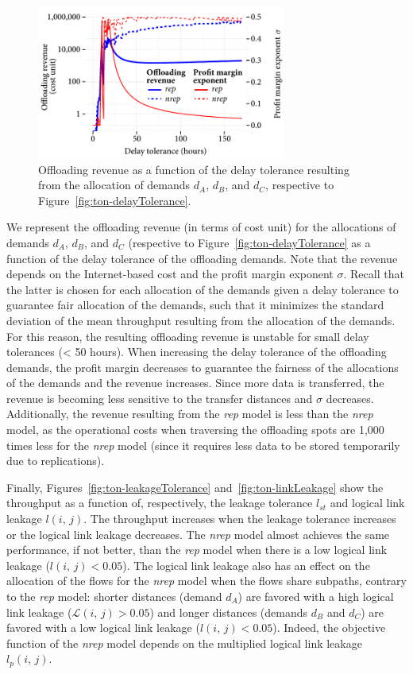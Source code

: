 \begin{figure}
    \centering
    \includegraphics[width=8.2cm]{results/revenue-delaytolerance.pdf}
    \caption{Offloading revenue as a function of the delay tolerance resulting from the allocation of demands $d_A$, $d_B$, and $d_C$, respective to Figure~\ref{fig:ton-delayTolerance}.}
    \label{fig:revenue-delay-tolerance}
\end{figure}
We represent the offloading revenue (in terms of cost unit) for the allocations of demands $d_A$, $d_B$, and $d_C$ (respective to Figure~\ref{fig:ton-delayTolerance} as a function of the delay tolerance of the offloading demands. Note that the revenue depends on the Internet-based cost and the profit margin exponent $\sigma$. Recall that the latter is chosen for each allocation of the demands given a delay tolerance to guarantee fair allocation of the demands, such that it minimizes the standard deviation of the mean throughput resulting from the allocation of the demands. For this reason,  the resulting offloading revenue is unstable for small delay tolerances (\ie < 50 hours). When increasing the delay tolerance of the offloading demands, the profit margin decreases to guarantee the fairness of the allocations of the demands and the revenue increases. Since more data is transferred, the revenue is becoming less sensitive to the transfer distances and $\sigma$ decreases. Additionally, the revenue resulting from the \textit{rep} model is less than the \textit{nrep} model, as the operational costs when traversing the offloading spots are 1,000 times less for the \textit{nrep} model (since it requires less data to be stored temporarily due to replications).

Finally, Figures~\ref{fig:ton-leakageTolerance} and~\ref{fig:ton-linkLeakage} show the throughput as a function of, respectively, the leakage tolerance $l_{st}$ and logical link leakage $l(i,\,j)$.  The throughput increases when the leakage tolerance increases or the logical link leakage decreases. The \textit{nrep} model almost achieves the same performance, if not better, than the \textit{rep} model when there is a low logical link leakage ($l(i,\,j) < 0.05$). The logical link leakage also has an effect on the allocation of the flows for the \textit{nrep} model when the flows share subpaths, contrary to the \textit{rep} model: shorter distances (demand $d_A$) are favored with a high logical link leakage ($\mathcal{L}(i,\,j) > 0.05$) and longer distances (demands $d_B$ and $d_C$) are favored with a low logical link leakage ($l(i,\,j) < 0.05$). Indeed, the objective function of the \textit{nrep} model depends on the multiplied logical link leakage $l_{p}(i,\,j)$.


